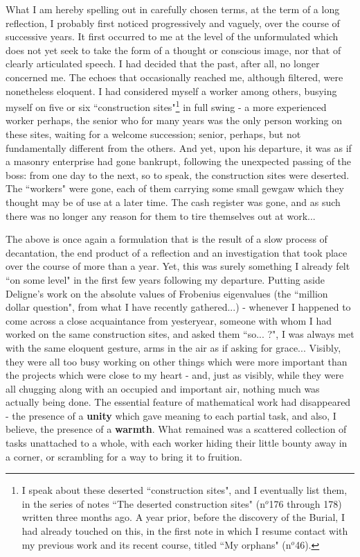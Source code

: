What I am hereby spelling out in carefully chosen terms, at the term of a long reflection, I probably first noticed progressively and vaguely, over the course of successive years. It first occurred to me at the level of the unformulated which does not yet seek to take the form of a thought or conscious image, nor that of clearly articulated speech. I had decided that the past, after all, no longer concerned me. The echoes that occasionally reached me, although filtered, were nonetheless eloquent. I had considered myself a worker among others, busying myself on five or six ``construction sites"\footnote{I speak about these deserted ``construction sites", and I eventually list them, in the series of notes ``The deserted construction sites" (n$^o$176 through 178) written three months ago. A year prior, before the discovery of the Burial, I had already touched on this, in the first note in which I resume contact with my previous work and its recent course, titled ``My orphans" (n$^o$46).} in full swing - a more experienced worker perhaps, the senior who for many years was the only person working on these sites, waiting for a welcome succession; senior, perhaps, but not fundamentally different from the others. And yet, upon his departure, it was as if a masonry enterprise had gone bankrupt, following the unexpected passing of the boss: from one day to the next, so to speak, the construction sites were deserted. The ``workers" were gone, each of them carrying some small gewgaw which they thought may be of use at a later time. The cash register was gone, and as such there was no longer any reason for them to tire themselves out at work...

The above is once again a formulation that is the result of a slow process of decantation, the end product of a reflection and an investigation that took place over the course of more than a year. Yet, this was surely something I already felt ``on some level" in the first few years following my departure. Putting aside Deligne's work on the absolute values of Frobenius eigenvalues (the ``million dollar question", from what I have recently gathered...) - whenever I happened to come across a close acquaintance from yesteryear, someone with whom I had worked on the same construction sites, and asked them ``so... ?", I was always met with the same eloquent gesture, arms in the air as if asking for grace... Visibly, they were all too busy working on other things which were more important than the projects which were close to my heart - and, just as visibly, while they were all chugging along with an occupied and important air, nothing much was actually being done. The essential feature of mathematical work had disappeared - the presence of a \textbf{unity} which gave meaning to each partial task, and also, I believe, the presence of a \textbf{warmth}. What remained was a scattered collection of tasks unattached to a whole, with each worker hiding their little bounty away in a corner, or scrambling for a way to bring it to fruition. 


